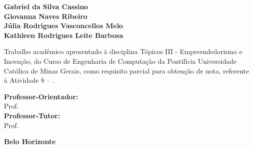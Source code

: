 \begin{folhaderosto}
    \begin{center}
        {\large \textbf{Gabriel da Silva Cassino}} \\
        {\large \textbf{Giovanna Naves Ribeiro}} \\
        {\large \textbf{Júlia Rodrigues Vasconcellos Melo}} \\
        {\large \textbf{Kathleen Rodrigues Leite Barbosa}}

        \vspace{5cm}

        {\Large \textbf{\tituloatividade}}

        \vspace{0.25cm}
        {\Large \tipoatividade}

        \vfill
    \end{center}

    \begin{flushright}
        \begin{minipage}{8cm}
            \begin{singlespace}
                {\small
                    Trabalho acadêmico apresentado à disciplina
                    Tópicos III - Empreendedorismo e Inovação,
                    do Curso de Engenharia de Computação da
                    Pontifícia Universidade Católica de Minas
                    Gerais, como requisito parcial para obtenção
                    de nota, referente à Atividade 8 -- \tituloatividade.
                }

                \vspace{0.5cm}
                {\small
                \textbf{Professor-Orientador:} \\ Prof. \orientador \\
                \textbf{Professor-Tutor:} \\ Prof. \tutor
                }
            \end{singlespace}
        \end{minipage}
    \end{flushright}

    \vfill

    \begin{center}
        {\large \textbf{Belo Horizonte}} \\
        {\large \textbf{\anoentrega}}
    \end{center}
\end{folhaderosto}
